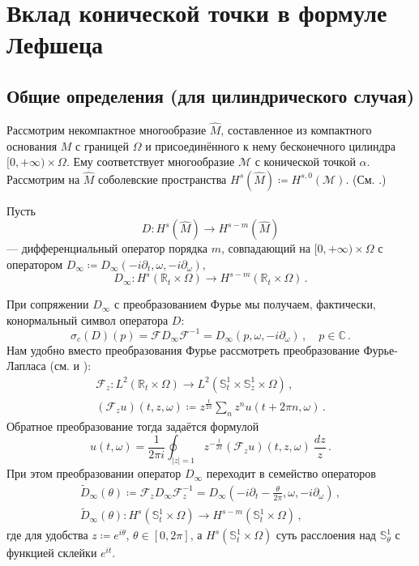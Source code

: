 \documentclass[a4paper, 12pt]{article}
\theoremstyle{definition}
\begin{document}
\section{Вклад конической точки в формуле Лефшеца}

\subsection{Общие определения (для цилиндрического случая)}

Рассмотрим некомпактное многообразие \({ \hat{M} }\), составленное из компактного основания \({ M }\) с границей \({ \Omega }\) и присоединённого к нему бесконечного цилиндра \({ [0, +\infty) \times \Omega }\). Ему соответствует многообразие \({ \mathcal M }\) с конической точкой \({ \alpha }\). Рассмотрим на \({ \hat{M} }\) соболевские пространства \({ H^{s}(\hat{M}) \coloneqq H^{s, 0}(\mathcal M) }\). (См. \cite[p. 46, Definition 2.3]{nazaikinskii2005elliptic}.)

Пусть \[
    D : H^{s}(\hat{M}) \to H^{s - m}(\hat{M}) \]
--- дифференциальный оператор порядка \({ m }\), совпадающий на \({ [0, +\infty) \times \Omega }\) с оператором \({ D_{\infty} \coloneqq D_{\infty}(-i \partial_{t}, \omega, -i \partial_{\omega}) }\), \[
    D_{\infty} : H^{s}(\mathbb R_{t} \times \Omega) \to H^{s-m}(\mathbb R_{t} \times \Omega)\,.
\]

При сопряжении \({ D_{\infty} }\) с преобразованием Фурье мы получаем, фактически, конормальный символ оператора \({ D }\): \[
    \sigma_{c}(D)(p) = \mathcal F D_{\infty} \mathcal F^{-1} = D_{\infty}(p, \omega, -i \partial_{\omega})\,, \quad p \in \mathbb C\,.
\] Нам удобно вместо преобразования Фурье рассмотреть преобразование Фурье-Лапласа (см. \cite{taubes1987gauge} и \cite{mrowka2016index}): \[
    \begin{gathered}
        \mathcal F_{z} : L^2(\mathbb R_{t} \times \Omega) \to L^2(\mathbb S^{1}_{t} \times \mathbb S^{1}_{z} \times \Omega)\,, \\
        \left( \mathcal F_{z}u \right)(t, z, \omega) \coloneqq z^{\frac{t}{2\pi}} \sum_{n} z^{n} u(t + 2\pi n, \omega)\,.
    \end{gathered}
\] Обратное преобразование тогда задаётся формулой \[
    u(t, \omega) = \frac{1}{2\pi i} \oint_{\lvert z \rvert = 1} z^{-\frac{t}{2\pi}} (\mathcal F_{z}u)(t, z, \omega)\: \frac{dz}{z}\,.
\] При этом преобразовании оператор \({ D_{\infty} }\) переходит в семейство операторов \[
    \begin{gathered}
        \widetilde D_{\infty}(\theta) \coloneqq \mathcal F_{z} D_{\infty} \mathcal F_{z}^{-1} = D_{\infty}(-i \partial_{t} - \frac{\theta}{2\pi}, \omega, -i \partial_{\omega})\,, \\
        \widetilde D_{\infty}(\theta) : H^{s}(\mathbb S^{1}_{t} \times \Omega) \to H^{s-m}(\mathbb S^{1}_{t} \times \Omega)\,,
    \end{gathered}
\] где для удобства \({ z \coloneqq e^{i\theta} }\), \({ \theta \in [0, 2\pi] }\), а \({ H^{s}(\mathbb S^{1}_{t} \times \Omega) }\) суть расслоения над \({ \mathbb S^{1}_{\theta} }\) с функцией склейки \({ e^{it} }\).
\end{document}
